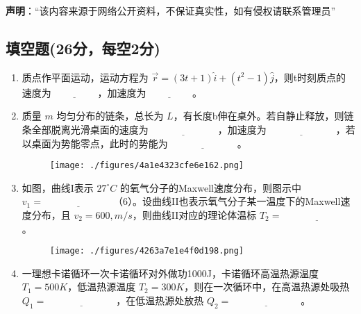 
\textbf{声明}：“该内容来源于网络公开资料，不保证真实性，如有侵权请联系管理员”

\subsection{填空题(26分，每空2分)}
\begin{enumerate}
        \item 质点作平面运动，运动方程为 $\vec{r} = (3t + 1) \hat{i} + (t^2 - 1) \hat{j}$，则t时刻质点的速度为$\underline{\hspace{2cm}}$，加速度为$\underline{\hspace{2cm}}$。
        
        \item 质量 $m$ 均匀分布的链条，总长为 $L$，有长度b伸在桌外。若自静止释放，则链条全部脱离光滑桌面的速度为$\underline{\hspace{3cm}}$，加速度为$\underline{\hspace{3cm}}$，若以桌面为势能零点，此时的势能为$\underline{\hspace{3cm}}$。
        \begin{figure}[ht]
        \centering
        \texttt{[image: ./figures/4a1e4323cfe6e162.png]}
        \caption{} \label{fig_NIU06_1}
        \end{figure}

        \item 如图，曲线I表示 $27^\circ C$ 的氧气分子的Maxwell速度分布，则图示中 $v_1 = \underline{\hspace{3cm}}$（6）。设曲线II也表示氧气分子某一温度下的Maxwell速度分布，且 $v_2 = 600 , m/s$，则曲线II对应的理论体温标 $T_2 = \underline{\hspace{3cm}}$。
        \begin{figure}[ht]
        \centering
        \texttt{[image: ./figures/4263a7e1e4f0d198.png]}
        \caption{} \label{fig_NIU06_2}
        \end{figure}

        \item 一理想卡诺循环一次卡诺循环对外做功1000J，卡诺循环高温热源温度 $T_1 = 500K$，低温热源温度 $T_2 = 300K$，则在一次循环中，在高温热源处吸热 $Q_1 = \underline{\hspace{3cm}}$，在低温热源处放热 $Q_2 = \underline{\hspace{3cm}}$。
        

\end{enumerate}
